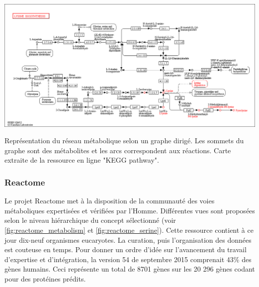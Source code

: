 \begin{refsegment}
    \begin{shadedfigure}[H]
        \centering
        \includegraphics[width=\textwidth]{img/kegg_lysine.png}
        \caption{ Représentation du réseau métabolique selon un graphe dirigé. Les sommets du graphe sont des métabolites et les arcs correspondent aux réactions. Carte extraite de la ressource en ligne "KEGG pathway". }
        \label{fig:kegg_lysine}
    \end{shadedfigure}
    
    \subsubsection{Reactome}
    Le projet Reactome \cite{joshi2005reactome,matthews2009reactome,croft2010reactome,croft2014reactome,fabregat2016reactome} met à la disposition de la communauté des voies métaboliques expertisées et vérifiées par l'Homme. Différentes vues sont proposées selon le niveau hiérarchique du concept sélectionné (voir \cref{fig:reactome_metabolism} et \cref{fig:reactome_serine}). Cette ressource contient à ce jour dix-neuf organismes eucaryotes. La curation, puis l'organisation des données est couteuse en temps. Pour donner un ordre d'idée sur l'avancement du travail d'expertise et d'intégration, la version 54 de septembre 2015 comprenait 43\% des gènes humains. Ceci représente un total de 8701 gènes sur les 20 296 gènes codant pour des protéines prédits.
    

\end{refsegment}
